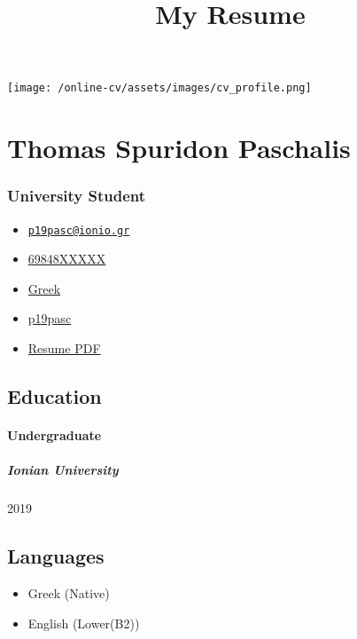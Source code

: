 \documentclass[
]{article}
\title{My Resume}
\author{}
\date{}
\providecommand{\tightlist}{%
  \setlength{\itemsep}{0pt}\setlength{\parskip}{0pt}}
\begin{document}
\maketitle

\texttt{[image: /online-cv/assets/images/cv\_profile.png]}

\hypertarget{thomas-spuridon-paschalis}{%
\section{Thomas Spuridon Paschalis}\label{thomas-spuridon-paschalis}}

\hypertarget{university-student}{%
\subsubsection{University Student}\label{university-student}}

\begin{itemize}
\tightlist
\item
  \emph{} \href{mailto:p19pasc@ionio.gr}{\nolinkurl{p19pasc@ionio.gr}}
\item
  \emph{} \href{tel:69848XXXXX}{69848XXXXX}
\item
  \emph{} \href{}{Greek}
\item
  \emph{} \href{http://github.com/p19pasc}{p19pasc}
\item
  \emph{} \href{https://pdfhost.io/v/GXHEi9lTm_My_Resume}{Resume PDF}
\end{itemize}

\hypertarget{education}{%
\subsection{Education}\label{education}}

\hypertarget{undergraduate}{%
\paragraph{Undergraduate}\label{undergraduate}}

\hypertarget{ionian-university}{%
\subparagraph{Ionian University}\label{ionian-university}}

2019

\hypertarget{languages}{%
\subsection{Languages}\label{languages}}

\begin{itemize}
\tightlist
\item
  Greek {(Native)}
\item
  English {(Lower(B2))}
\end{itemize}
\end{document}
